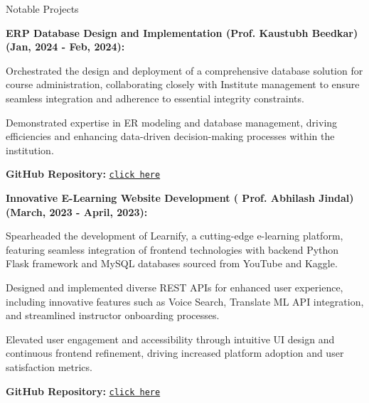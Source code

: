 \begin{rubric}{Notable Projects}

    \entry*
\textbf{ERP Database Design and Implementation (Prof. Kaustubh Beedkar) (Jan, 2024 - Feb, 2024):}\par
    Orchestrated the design and deployment of a comprehensive database solution for course administration, collaborating closely with Institute management to ensure seamless integration and adherence to essential integrity constraints.\par
    Demonstrated expertise in ER modeling and database management, driving efficiencies and enhancing data-driven decision-making processes within the institution.\par
    \textbf{GitHub Repository:} \href{https://github.com/nikhiltej5/postgresql_erp.git}{\texttt{click here}}

    \entry*
\textbf{Innovative E-Learning Website Development ( Prof. Abhilash Jindal) (March, 2023 - April, 2023):}\par
    Spearheaded the development of Learnify, a cutting-edge e-learning platform, featuring seamless integration of frontend technologies with backend Python Flask framework and MySQL databases sourced from YouTube and Kaggle.\par
    Designed and implemented diverse REST APIs for enhanced user experience, including innovative features such as Voice Search, Translate ML API integration, and streamlined instructor onboarding processes.\par
    Elevated user engagement and accessibility through intuitive UI design and continuous frontend refinement, driving increased platform adoption and user satisfaction metrics.\par
    \textbf{GitHub Repository:} \href{https://github.com/nikhiltej5/Learnify.git}{\texttt{click here}}


\end{rubric}
